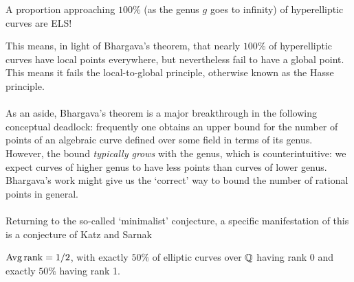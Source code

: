 \documentclass[12pt,amsfont]{amsart}
\begin{document}
\begin{fact} A proportion approaching $100\%$ (as the genus $g$ goes to infinity) of hyperelliptic curves are ELS!
\end{fact}

This means, in light of Bhargava's theorem, that nearly $100\%$ of hyperelliptic curves have local points everywhere, but nevertheless fail to have a global point. This means it fails the local-to-global principle, otherwise known as the Hasse principle. \\ \\
As an aside, Bhargava's theorem is a major breakthrough in the following conceptual deadlock: frequently one obtains an upper bound for the number of points of an algebraic curve defined over some field in terms of its genus. However, the bound \emph{typically grows} with the genus, which is counterintuitive: we expect curves of higher genus to have less points than curves of lower genus. Bhargava's work might give us the `correct' way to bound the number of rational points in general. \\ \\
Returning to the so-called `minimalist' conjecture, a specific manifestation of this is a conjecture of Katz and Sarnak

\begin{cnj} $\operatorname{Avg} \operatorname{rank} = 1/2$, with exactly $50\%$ of elliptic curves over ${\mathbb Q}$ having rank 0 and exactly $50\%$ having rank 1.
\end{cnj} 
\end{document}
